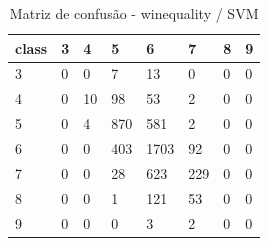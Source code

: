 \begin{table}[htbp]
\centering
\begin{tabular}{llllllll}
\hline
class & 3 & 4 & 5 & 6 & 7 & 8 & 9 \\
\hline
3 & 0 & 0 & 7 & 13 & 0 & 0 & 0 \\
4 & 0 & 10 & 98 & 53 & 2 & 0 & 0 \\
5 & 0 & 4 & 870 & 581 & 2 & 0 & 0 \\
6 & 0 & 0 & 403 & 1703 & 92 & 0 & 0 \\
7 & 0 & 0 & 28 & 623 & 229 & 0 & 0 \\
8 & 0 & 0 & 1 & 121 & 53 & 0 & 0 \\
9 & 0 & 0 & 0 & 3 & 2 & 0 & 0 \\
\hline
\end{tabular}
\caption{Matriz de confusão - winequality / SVM}
\label{tab:ex3-winequality-svm-cm}
\end{table}